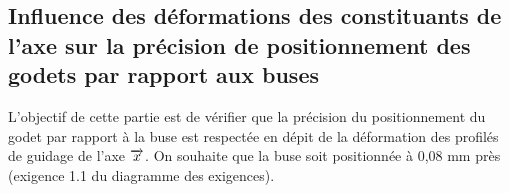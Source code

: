 \documentclass[10pt,fleqn]{article} %
\begin{document}

\vspace{10cm}
\pagestyle{fancy}
\thispagestyle{plain}


\def\columnseprulecolor{\color{ocre}}
\setlength{\columnseprule}{0.4pt} 

\begin{multicols}{2}

\subsection*{Influence des déformations des constituants de l’axe sur la précision
de positionnement des godets par rapport aux buses}

\begin{obj}
L’objectif de cette partie est de vérifier que la précision du positionnement du godet par rapport à la
buse est respectée en dépit de la déformation des profilés de guidage de l’axe $\overrightarrow{x}$. On souhaite que la
buse soit positionnée à 0,08 mm près (exigence 1.1 du diagramme des exigences).
\end{obj}

\end{multicols}
\end{document}

